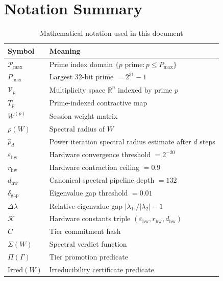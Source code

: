 \documentclass[12pt,letterpaper]{article}
\theoremstyle{plain}
\theoremstyle{definition}
\theoremstyle{remark}
\begin{document}
\appendix

\section{Notation Summary}

\begin{table}[H]
\centering
\caption{Mathematical notation used in this document}
\begin{tabular}{ll}
\toprule
\textbf{Symbol} & \textbf{Meaning} \\
\midrule
\(\mathcal{P}_{\max}\) & Prime index domain \(\{p \text{ prime}: p \leq P_{\max}\}\) \\
\(P_{\max}\) & Largest 32-bit prime \(= 2^{31}-1\) \\
\(\mathcal{V}_p\) & Multiplicity space \(\mathbb{R}^n\) indexed by prime \(p\) \\
\(T_p\) & Prime-indexed contractive map \\
\(W^{(p)}\) & Session weight matrix \\
\(\rho(W)\) & Spectral radius of \(W\) \\
\(\hat{\rho}_d\) & Power iteration spectral radius estimate after \(d\) steps \\
\(\varepsilon_{\mathrm{hw}}\) & Hardware convergence threshold \(= 2^{-20}\) \\
\(r_{\mathrm{hw}}\) & Hardware contraction ceiling \(= 0.9\) \\
\(d_{\mathrm{hw}}\) & Canonical spectral pipeline depth \(= 132\) \\
\(\delta_{\mathrm{gap}}\) & Eigenvalue gap threshold \(= 0.01\) \\
\(\Delta\lambda\) & Relative eigenvalue gap \(|\lambda_1|/|\lambda_2| - 1\) \\
\(\mathcal{K}\) & Hardware constants triple \((\varepsilon_{\mathrm{hw}}, r_{\mathrm{hw}}, d_{\mathrm{hw}})\) \\
\(C\) & Tier commitment hash \\
\(\Sigma(W)\) & Spectral verdict function \\
\(\Pi(\Gamma)\) & Tier promotion predicate \\
\(\mathrm{Irred}(W)\) & Irreducibility certificate predicate \\
\bottomrule
\end{tabular}
\end{table}
\end{document}
